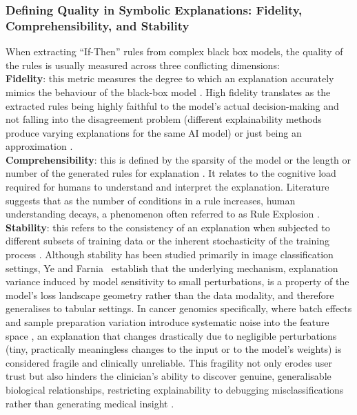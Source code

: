 \label{ssub:auditing}

\subsubsection{Defining Quality in Symbolic Explanations: Fidelity, Comprehensibility, and Stability}
\label{ssub:quality-defn}
When extracting ``If-Then'' rules from complex black box models, the quality of the rules is usually
measured across three conflicting dimensions:
\\
\textbf{Fidelity}: this metric measures the degree to which an explanation accurately mimics the
behaviour of the black-box model \cite{Guidotti2021}. High fidelity translates as the extracted rules
being highly faithful to the model's actual decision-making and not falling into the disagreement
problem (different explainability methods produce varying explanations for the same AI model) or just
being an approximation \cite{Miro2025}.
\\
\textbf{Comprehensibility}: this is defined by the sparsity of the model or the length or number of
the generated rules for explanation \cite{Arrieta2020,Yedjour2024}. It relates to the cognitive load
required for humans to understand and interpret the explanation. Literature suggests that as the
number of conditions in a rule increases, human understanding decays, a phenomenon often referred to
as Rule Explosion \cite{Arrieta2020,Yedjour2024}.
\\
\textbf{Stability}: this refers to the consistency of an explanation when subjected to different
subsets of training data or the inherent stochasticity of the training process \cite{Ye2024}.
Although stability has been studied primarily in image classification settings, Ye and
Farnia~\cite{Ye2024} establish that the underlying mechanism, explanation variance induced by model
sensitivity to small perturbations, is a property of the model's loss landscape geometry rather than
the data modality, and therefore generalises to tabular settings. In cancer genomics specifically,
where batch effects and sample preparation variation introduce systematic noise into the feature
space \cite{Partin2023}, an explanation that changes drastically due to negligible perturbations (tiny, practically
meaningless changes to the input or to the model's weights) is considered fragile and clinically
unreliable. This fragility not only erodes user trust
\cite{Wicker2023} but also hinders the clinician's ability to discover genuine, generalisable
biological relationships, restricting explainability to debugging misclassifications rather than
generating medical insight \cite{Ye2024}.

